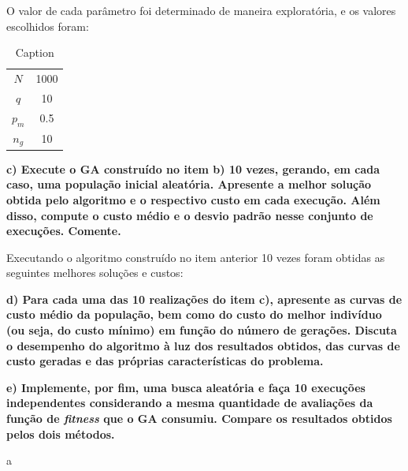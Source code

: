 \documentclass[a4paper, 12pt]{article}
\begin{document}
O valor de cada parâmetro foi determinado de maneira exploratória, e os valores escolhidos foram:
\begin{table}[H]
    \centering
    \begin{tabular}{c|c}
        $N$ & 1000\\
        $q$ & 10\\
        $p_m$ & 0.5\\
        $n_g$ & 10\\
    \end{tabular}
    \caption{Caption}
    \label{tab:my_label}
\end{table}

\textbf{c) Execute o GA construído no item b) 10 vezes, gerando, em cada caso, uma população inicial aleatória. Apresente a melhor solução obtida pelo algoritmo e o respectivo custo em cada execução. Além disso, compute o custo médio e o desvio padrão nesse conjunto de execuções. Comente.}

Executando o algoritmo construído no item anterior 10 vezes foram obtidas as seguintes melhores soluções e custos:

\textbf{d) Para cada uma das 10 realizações do item c), apresente as curvas de custo médio da população, bem como do custo do melhor indivíduo (ou seja, do custo mínimo) em função do número de gerações. Discuta o desempenho do algoritmo à luz dos resultados obtidos, das curvas de custo geradas e das próprias características do problema.}

\textbf{e) Implemente, por fim, uma busca aleatória e faça 10 execuções independentes considerando a mesma quantidade de avaliações da função de \textit{fitness} que o GA consumiu. Compare os resultados obtidos pelos dois métodos.}

\newpage






a
\end{document}
